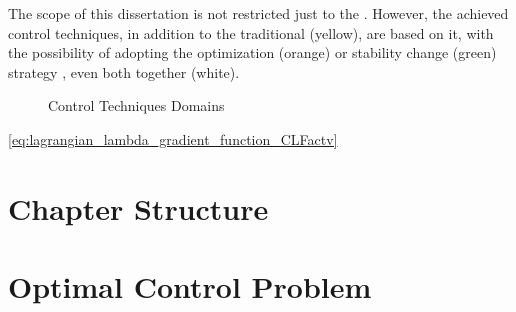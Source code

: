 The scope of this dissertation is not restricted just to the . However, the achieved control techniques, in addition to the traditional  (yellow), are based on it, with the possibility of adopting the optimization (orange) or stability change (green) strategy , even both together (white).

\begin{figure}[!h]
\centering
{}
\caption{Control Techniques Domains}
\label{fig:Control_Techniques_Domains}
\end{figure}







\eqref{eq:lagrangian_lambda_gradient_function_CLFactv}


\section{Chapter Structure}
\label{ch1_sec:Chapter_Structure} 

\section{Optimal Control Problem}
\label{ch1_sec:Chapter_Structure} 

